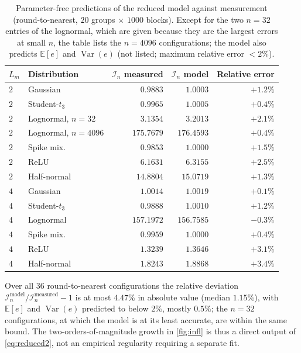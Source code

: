 \documentclass[twocolumn,review,hidelinks,oneeqnum,onetabnum,onefignum,onethmnum]{siamart251216}
\begin{document}
\begin{table}[!tb]
\centering
\caption{Parameter-free predictions of the reduced model against measurement
(round-to-nearest, $20$ groups $\times$ $1000$ blocks). Except for the two
$n=32$ entries of the lognormal, which are given because they are the largest
errors at small $n$, the table lists the $n=4096$ configurations; the model also
predicts $\mathbb{E}[e]$ and $\operatorname{Var}(e)$ (not listed; maximum
relative error $<2\%$).}
\label{tab:model}
\footnotesize
\begin{tabular}{@{}llrrr@{}}
\toprule
$L_m$ & Distribution & $\mathcal I_n$ measured & $\mathcal I_n$ model & Relative error \\
\midrule
$2$ & Gaussian    & $0.9883$ & $1.0003$ & $+1.2\%$ \\
$2$ & Student-$t_3$ & $0.9965$ & $1.0005$ & $+0.4\%$ \\
$2$ & Lognormal, $n=32$ & $3.1354$ & $3.2013$ & $+2.1\%$ \\
$2$ & Lognormal, $n=4096$ & $175.7679$ & $176.4593$ & $+0.4\%$ \\
$2$ & Spike mix.  & $0.9853$ & $1.0000$ & $+1.5\%$ \\
$2$ & ReLU        & $\mathbf{6.1631}$ & $6.3155$ & $+2.5\%$ \\
$2$ & Half-normal & $\mathbf{14.8804}$ & $15.0719$ & $+1.3\%$ \\
\midrule
$4$ & Gaussian    & $1.0014$ & $1.0019$ & $+0.1\%$ \\
$4$ & Student-$t_3$ & $0.9888$ & $1.0010$ & $+1.2\%$ \\
$4$ & Lognormal   & $157.1972$ & $156.7585$ & $-0.3\%$ \\
$4$ & Spike mix.  & $0.9959$ & $1.0000$ & $+0.4\%$ \\
$4$ & ReLU        & $\mathbf{1.3239}$ & $1.3646$ & $+3.1\%$ \\
$4$ & Half-normal & $\mathbf{1.8243}$ & $1.8868$ & $+3.4\%$ \\
\bottomrule
\end{tabular}
\end{table}

\noindent Over all $36$ round-to-nearest configurations the relative deviation
$\mathcal I_n^{\text{model}}/\mathcal I_n^{\text{measured}}-1$ is at most $4.47\%$
in absolute value (median $1.15\%$), with $\mathbb{E}[e]$ and
$\operatorname{Var}(e)$ predicted to below $2\%$, mostly $0.5\%$; the $n=32$
configurations, at which the model is at its least accurate, are within the same
bound. The two-orders-of-magnitude growth in \cref{fig:infl} is thus a direct
output of \cref{eq:reduced2}, not an empirical regularity requiring a separate
fit.
\end{document}
